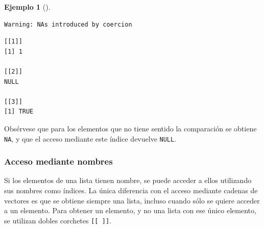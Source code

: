 \documentclass[
  a4paper,
]{scrreport}
\theoremstyle{definition}
\theoremstyle{definition}
\newtheorem{example}{Ejemplo}[chapter]
\theoremstyle{remark}
\begin{document}
\begin{example}[]
\begin{verbatim}
Warning: NAs introduced by coercion
\end{verbatim}

\begin{verbatim}
[[1]]
[1] 1

[[2]]
NULL

[[3]]
[1] TRUE
\end{verbatim}

Obsérvese que para los elementos que no tiene sentido la comparación se
obtiene \texttt{NA}, y que el acceso mediante este índice devuelve
\texttt{NULL}.

\end{example}

\hypertarget{acceso-mediante-nombres}{%
\subsubsection{Acceso mediante nombres}\label{acceso-mediante-nombres}}

Si los elementos de una lista tienen nombre, se puede acceder a ellos
utilizando sus nombres como índices. La única diferencia con el acceso
mediante cadenas de vectores es que se obtiene siempre una lista,
incluso cuando sólo se quiere acceder a un elemento. Para obtener un
elemento, y no una lista con ese único elemento, se utilizan dobles
corchetes \texttt{{[}{[}\ {]}{]}}.
\end{document}
